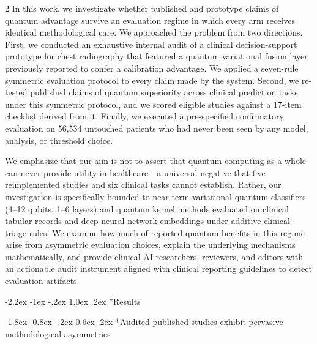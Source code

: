 \documentclass[10pt,a4paper,twoside]{article}
\makeatletter
\renewcommand{\section}{\@startsection{section}{1}{\z@}%
  {-2.2ex \@plus -1ex \@minus -.2ex}%
  {1.0ex \@plus.2ex}%
  {\normalfont\large\sffamily\bfseries\color{naturedark}}}
\renewcommand{\subsection}{\@startsection{subsection}{2}{\z@}%
  {-1.8ex \@plus -0.8ex \@minus -.2ex}%
  {0.6ex \@plus.2ex}%
  {\normalfont\normalsize\sffamily\bfseries\color{naturedark}}}
\makeatother
\begin{document}
\begin{multicols}{2}
In this work, we investigate whether published and prototype claims of quantum advantage survive an evaluation regime in which every arm receives identical methodological care. We approached the problem from two directions. First, we conducted an exhaustive internal audit of a clinical decision-support prototype for chest radiography that featured a quantum variational fusion layer previously reported to confer a calibration advantage. We applied a seven-rule symmetric evaluation protocol to every claim made by the system. Second, we re-tested published claims of quantum superiority across clinical prediction tasks under this symmetric protocol, and we scored eligible studies against a 17-item checklist derived from it. Finally, we executed a pre-specified confirmatory evaluation on 56,534 untouched patients who had never been seen by any model, analysis, or threshold choice.

We emphasize that our aim is not to assert that quantum computing as a whole can never provide utility in healthcare---a universal negative that five reimplemented studies and six clinical tasks cannot establish. Rather, our investigation is specifically bounded to near-term variational quantum classifiers (4--12 qubits, 1--6 layers) and quantum kernel methods evaluated on clinical tabular records and deep neural network embeddings under additive clinical triage rules. We examine how much of reported quantum benefits in this regime arise from asymmetric evaluation choices, explain the underlying mechanisms mathematically, and provide clinical AI researchers, reviewers, and editors with an actionable audit instrument aligned with clinical reporting guidelines \cite{collins2021,liu2020consort} to detect evaluation artifacts.

\section*{Results}

\subsection*{Audited published studies exhibit pervasive methodological asymmetries}


\end{multicols}
\end{document}
